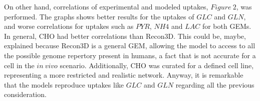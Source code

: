 	
	On other hand, correlations of experimental and modeled uptakes, $Figure\ 2$, was performed. The graphs shows better results for the uptakes of $GLC$ and $GLN$, 
	and worse correlations for uptakes such as $PYR$, $NH4$ and $LAC$ for both GEMs. In general, CHO had better correlations than Recon3D. This could be, maybe, explained because Recon3D is a general GEM, allowing the model to access to all the possible genome repertory present in humans, a fact that is not accurate for a cell in the $in\ vivo$ scenario. Additionally, CHO was curated for a defined cell line, representing a more restricted and realistic network. Anyway, it is remarkable that the models reproduce uptakes like $GLC$ and $GLN$ regarding all the previous consideration.